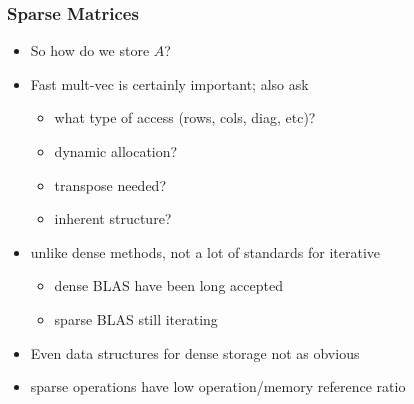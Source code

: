 \documentclass[10pt]{beamer}
\begin{document}
\begin{frame}
\frametitle{Sparse Matrices}
  \begin{itemize}
    \item So how do we store $A$?
    \item Fast mult-vec is certainly important; also ask
      \begin{itemize}
        \item what type of access (rows, cols, diag, etc)?
        \item dynamic allocation?
        \item transpose needed?
        \item inherent structure?
      \end{itemize}
    \item unlike dense methods, not a lot of standards for iterative
      \begin{itemize}
        \item dense BLAS have been long accepted
        \item sparse BLAS still iterating
      \end{itemize}
    \item Even data structures for dense storage not as obvious
    \item sparse operations have low operation/memory reference ratio
  \end{itemize}
\end{frame}

\end{document}
